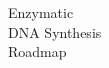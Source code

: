 \begin{titlepage}
    \thispagestyle{empty}

    \begin{flushleft}
        {   
            \fontsize{60pt}{60pt}
            \selectfont
            {Enzymatic}\\
            {DNA Synthesis}\\
            {Roadmap}
        }   
        \vfill
    \end{flushleft}
\end{titlepage}
